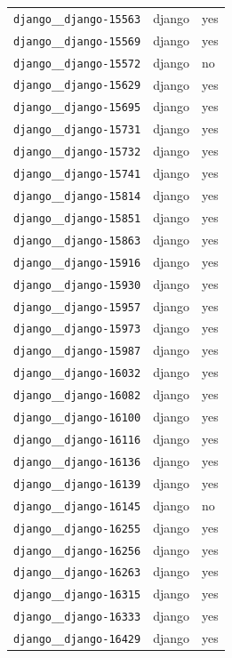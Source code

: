 \begin{longtable}{@{}p{}lp{}@{}}
\texttt{django\_\_django-15563} & django & yes \\
\texttt{django\_\_django-15569} & django & yes \\
\texttt{django\_\_django-15572} & django & no \\
\texttt{django\_\_django-15629} & django & yes \\
\texttt{django\_\_django-15695} & django & yes \\
\texttt{django\_\_django-15731} & django & yes \\
\texttt{django\_\_django-15732} & django & yes \\
\texttt{django\_\_django-15741} & django & yes \\
\texttt{django\_\_django-15814} & django & yes \\
\texttt{django\_\_django-15851} & django & yes \\
\texttt{django\_\_django-15863} & django & yes \\
\texttt{django\_\_django-15916} & django & yes \\
\texttt{django\_\_django-15930} & django & yes \\
\texttt{django\_\_django-15957} & django & yes \\
\texttt{django\_\_django-15973} & django & yes \\
\texttt{django\_\_django-15987} & django & yes \\
\texttt{django\_\_django-16032} & django & yes \\
\texttt{django\_\_django-16082} & django & yes \\
\texttt{django\_\_django-16100} & django & yes \\
\texttt{django\_\_django-16116} & django & yes \\
\texttt{django\_\_django-16136} & django & yes \\
\texttt{django\_\_django-16139} & django & yes \\
\texttt{django\_\_django-16145} & django & no \\
\texttt{django\_\_django-16255} & django & yes \\
\texttt{django\_\_django-16256} & django & yes \\
\texttt{django\_\_django-16263} & django & yes \\
\texttt{django\_\_django-16315} & django & yes \\
\texttt{django\_\_django-16333} & django & yes \\
\texttt{django\_\_django-16429} & django & yes \\

\end{longtable}
